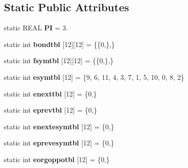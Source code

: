 \subsection*{Static Public Attributes}
\begin{DoxyCompactItemize}
\item 
\mbox{\label{classtetgenmesh_ad6766e0d2dbbf0a642793fbd6ef98ae2}} 
static R\+E\+AL {\bfseries PI} = 3.
\item 
\mbox{\label{classtetgenmesh_a46550a87561b0b4a7dfc7a312b03d3ea}} 
static int {\bfseries bondtbl} \mbox{[}12\mbox{]}\mbox{[}12\mbox{]} = \{\{0,\},\}
\item 
\mbox{\label{classtetgenmesh_ae98d2426c6fc6665cb96dcfa9a5df790}} 
static int {\bfseries fsymtbl} \mbox{[}12\mbox{]}\mbox{[}12\mbox{]} = \{\{0,\},\}
\item 
\mbox{\label{classtetgenmesh_ae23c95f112c7dcc119b8780b36d6c833}} 
static int {\bfseries esymtbl} \mbox{[}12\mbox{]} = \{9, 6, 11, 4, 3, 7, 1, 5, 10, 0, 8, 2\}
\item 
\mbox{\label{classtetgenmesh_afc8cb9e38dc9efd6c4903b00679d693e}} 
static int {\bfseries enexttbl} \mbox{[}12\mbox{]} = \{0,\}
\item 
\mbox{\label{classtetgenmesh_aaa63200d533d2d774680a0cb72475361}} 
static int {\bfseries eprevtbl} \mbox{[}12\mbox{]} = \{0,\}
\item 
\mbox{\label{classtetgenmesh_a786d6315851349b63d53f1eb8a1fcef1}} 
static int {\bfseries enextesymtbl} \mbox{[}12\mbox{]} = \{0,\}
\item 
\mbox{\label{classtetgenmesh_aed59b6aa2586787f5bd0820d1ce41b4f}} 
static int {\bfseries eprevesymtbl} \mbox{[}12\mbox{]} = \{0,\}
\item 
\mbox{\label{classtetgenmesh_a7c43767f721d455559988e2f168ff4b2}} 
static int {\bfseries eorgoppotbl} \mbox{[}12\mbox{]} = \{0,\}
\item 
\mbox{\label{classtetgenmesh_a958c01959dff786bf047d2f270849ffa}} 

\end{DoxyCompactItemize}
